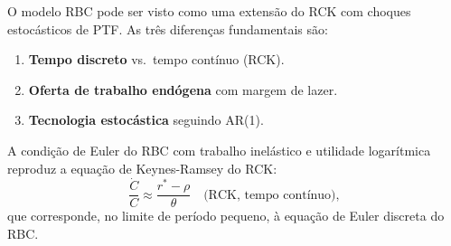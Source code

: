 \documentclass[11pt,a4paper]{article}
\begin{document}
O modelo RBC pode ser visto como uma extensão do RCK com choques estocásticos
de PTF. As três diferenças fundamentais são:

\begin{enumerate}
  \item \textbf{Tempo discreto} vs.\ tempo contínuo (RCK).
  \item \textbf{Oferta de trabalho endógena} com margem de lazer.
  \item \textbf{Tecnologia estocástica} seguindo AR(1).
\end{enumerate}

A condição de Euler do RBC com trabalho inelástico e utilidade logarítmica reproduz
a equação de Keynes-Ramsey do RCK:
\[
  \frac{\dot C}{C} \approx \frac{r^* - \rho}{\theta}
  \quad \text{(RCK, tempo contínuo)},
\]
que corresponde, no limite de período pequeno, à equação de Euler discreta do RBC.
\end{document}
